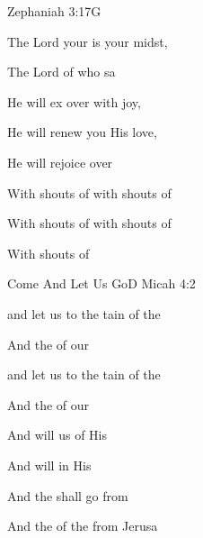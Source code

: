 \begin{song}{Zephaniah 3:17}{G}
  {}
  {}
  {}
  {\NotCCLIed}

  \renewcommand{\RevDate}{February~11,~1993}

  \begin{SBOpGroup}
     The Lord your  is  your midst,
    
     The Lord of  who sa
    
     He will ex over  with joy,
    
     He will renew you  His love,
    
     He will rejoice over 
    
    With shouts of    with shouts of   
    
    With shouts of   with shouts of  
    
    With shouts of 
  \end{SBOpGroup}
\end{song}


\begin{song}{Come And Let Us Go}{D}
  {}
  {}
  {Micah 4:2}
  {\NotCCLIed}

  \renewcommand{\RevDate}{February~11,~1993}

  \begin{SBOpGroup}
     and let us  to the tain of the 
    
    And  the  of our 
    
     and let us  to the tain of the 
    
    And  the  of our 
    
    And  will  us of His  
    
    And  will  in His  
    
    And the  shall go  from 
    
    And the  of the  from Jerusa
  \end{SBOpGroup}
\end{song}


